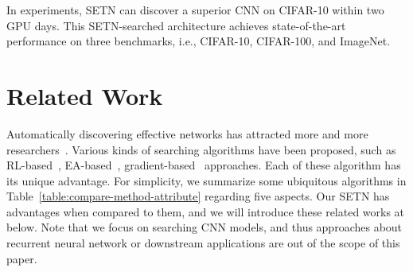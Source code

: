 \documentclass[10pt,twocolumn,letterpaper]{article}
\def\Tabref#1{Table~\ref{#1}}
\def\NAME{{SETN}}
\begin{document}
In experiments, {\NAME} can discover a superior CNN on CIFAR-10 within two GPU days.
This {\NAME}-searched architecture achieves state-of-the-art performance on three benchmarks, i.e., CIFAR-10, CIFAR-100, and ImageNet.









\section{Related Work}\label{sec:related-work}

Automatically discovering effective networks has attracted more and more researchers~\cite{brock2018smash,baker2017designing,zoph2017NAS,liu2018hierarchical,fang2020densely,dong2019network}. Various kinds of searching algorithms have been proposed, such as RL-based~\cite{zoph2017NAS,Zoph_2018_CVPR,pmlr-v80-pham18a}, EA-based~\cite{real2019regularized,real2017large}, gradient-based~\cite{liu2019darts,luo2018neural} approaches. Each of these algorithm has its unique advantage.
For simplicity, we summarize some ubiquitous algorithms in \Tabref{table:compare-method-attribute} regarding five aspects.
Our {\NAME} has advantages when compared to them, and we will introduce these related works at below. Note that we focus on searching CNN models, and thus approaches about recurrent neural network or downstream applications are out of the scope of this paper.
\end{document}
